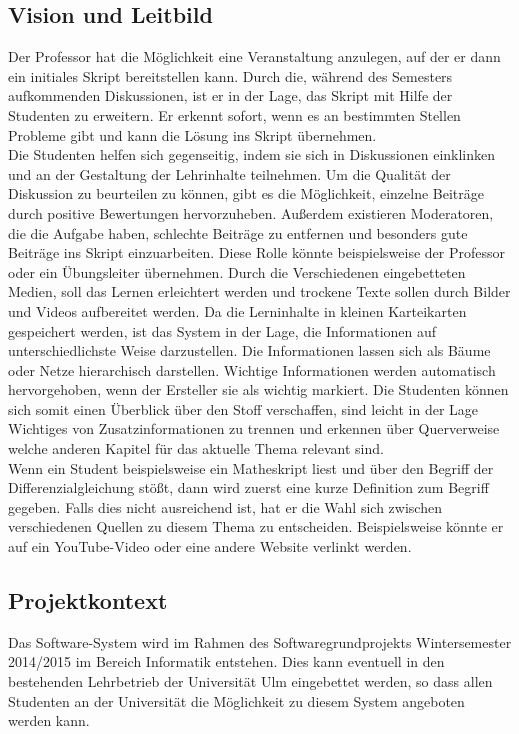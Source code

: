 \documentclass[12pt,a4paper]{article}
\begin{document}
\subsection{Vision und Leitbild}
Der Professor hat die Möglichkeit eine Veranstaltung anzulegen, auf der er dann ein initiales Skript bereitstellen kann. Durch die, während des Semesters aufkommenden Diskussionen, ist er in der Lage, das Skript mit Hilfe der Studenten zu erweitern. Er erkennt sofort, wenn es an bestimmten Stellen Probleme gibt und kann die Lösung ins Skript übernehmen. \\
Die Studenten helfen sich gegenseitig, indem sie sich in Diskussionen einklinken und an der Gestaltung der Lehrinhalte teilnehmen. Um die Qualität der Diskussion zu beurteilen zu können, gibt es die Möglichkeit, einzelne Beiträge durch positive Bewertungen hervorzuheben. Außerdem existieren Moderatoren, die die Aufgabe haben, schlechte Beiträge zu entfernen und besonders gute Beiträge ins Skript einzuarbeiten. Diese Rolle könnte beispielsweise der Professor oder ein Übungsleiter übernehmen. Durch die Verschiedenen eingebetteten Medien, soll das Lernen erleichtert werden und trockene Texte sollen durch Bilder und Videos aufbereitet werden. Da die Lerninhalte in kleinen Karteikarten gespeichert werden, ist das System in der Lage, die Informationen auf unterschiedlichste Weise darzustellen. Die Informationen lassen sich als Bäume oder Netze hierarchisch darstellen. Wichtige Informationen werden automatisch hervorgehoben, wenn der Ersteller sie als wichtig markiert. Die Studenten können sich somit einen Überblick über den Stoff verschaffen, sind leicht in der Lage Wichtiges von Zusatzinformationen zu trennen und erkennen über Querverweise welche anderen Kapitel für das aktuelle Thema relevant sind. \\
Wenn ein Student beispielsweise ein Matheskript liest und über den Begriff der Differenzialgleichung stößt, dann wird zuerst eine kurze Definition zum Begriff gegeben. Falls dies nicht ausreichend ist, hat er die Wahl sich zwischen verschiedenen Quellen zu diesem Thema zu entscheiden. Beispielsweise könnte er auf ein YouTube-Video oder eine andere Website verlinkt werden. 

\subsection{Projektkontext}
Das Software-System wird im Rahmen des Softwaregrundprojekts Wintersemester 2014/2015 im Bereich Informatik entstehen. Dies kann eventuell in den bestehenden Lehrbetrieb der Universität Ulm eingebettet werden, so dass allen Studenten an der Universität die Möglichkeit zu diesem System angeboten werden kann.
\end{document}
